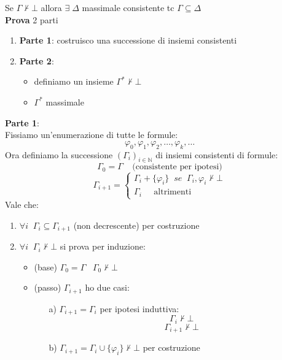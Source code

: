 \documentclass{article}
\theoremstyle{break}
\theoremstyle{break}
\theoremstyle{break}
\theoremstyle{break}
\begin{document}
Se \( \Gamma \not\vdash \bot \) allora \( \exists \; \Delta \) massimale consistente tc
\( \Gamma \subseteq \Delta \)\\
\textbf{Prova} 2 parti
\begin{enumerate}
  \item \textbf{Parte 1}: costruisco una successione di insiemi consistenti
  \item \textbf{Parte 2}: 
    \begin{itemize}
      \item definiamo un insieme \( \Gamma^* \not\vdash \bot \)
      \item \( \Gamma^* \) massimale 
    \end{itemize}
\end{enumerate}
\textbf{Parte 1}:\\
Fissiamo un'enumerazione di tutte le formule:
\[
  \varphi_0, \varphi_1, \varphi_2, \ldots, \varphi_k, \ldots
\] 
Ora definiamo la successione \( (\Gamma_i)_{i \in \mathbb{N}} \) di insiemi consistenti di formule:
\[
  \Gamma_0 = \Gamma\;\;\;\; \text{(consistente per ipotesi)}
\] 
\[
  \Gamma_{i+1} = \begin{cases}
    \Gamma_i + \{\varphi_i\}\;\;se\;\; \Gamma_i,\varphi_i \not\vdash \bot \\
    \Gamma_i\;\;\;\;\; \text{altrimenti}
  \end{cases}
\]  
Vale che:
\begin{enumerate}
  \item \( \forall i \;\; \Gamma_i \subseteq \Gamma_{i+1} \) (non decrescente) per costruzione
  \item \( \forall i\;\; \Gamma_i \not\vdash \bot \) si prova per induzione:
    \begin{itemize}
      \item (base) \( \Gamma_0 = \Gamma \;\;\; \Gamma_0 \not\vdash \bot \) 
      \item (passo) \( \Gamma_{i+1} \) ho due casi:
        \begin{enumerate}
          \item[a)] \( \Gamma_{i+1} = \Gamma_i \) per ipotesi induttiva:
            \[ \Gamma_i \not\vdash \bot \]
            \[
              \Gamma_{i+1} \not\vdash \bot
            \] 
          \item[b)] \( \Gamma_{i+1} = \Gamma_i \cup \{\varphi_i\} \not\vdash \bot \) per costruzione
        \end{enumerate}
    \end{itemize}
\end{enumerate}
\end{document}
